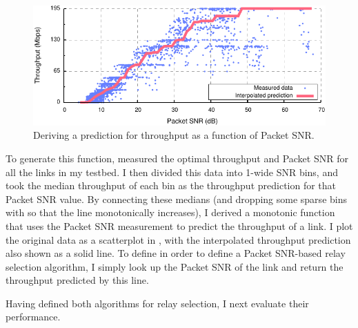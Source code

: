 \begin{figure}[t]
	\centering
	\includegraphics[width=\textwidth]{figures/applications/snr_vs_mbps.pdf}
	\caption{\label{fig:snr_vs_mbps}Deriving a prediction for throughput as a function of Packet SNR.}
\end{figure}

To generate this function, measured the optimal throughput and Packet SNR for all the links in my testbed. I then divided this data into 1\dB-wide SNR bins, and took the median throughput of each bin as the throughput prediction for that Packet SNR value. By connecting these medians (and dropping some sparse bins with so that the line monotonically increases), I derived a monotonic function that uses the Packet SNR measurement to predict the throughput of a link. I plot the original data as a scatterplot in , with the interpolated throughput prediction also shown as a solid line. To define  in order to define a Packet SNR-based relay selection algorithm, I simply look up the Packet SNR of the link and return the throughput predicted by this line.

Having defined both algorithms for relay selection, I next evaluate their performance.


